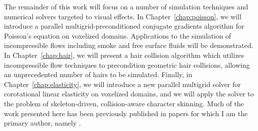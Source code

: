 The remainder of this work will focus on a number of simulation
techniques and numerical solvers targeted to visual effects.  In
Chapter~\ref{chap:poisson}, we will introduce a parallel
multigrid-preconditioned conjugate gradients algorithm for Poisson's
equation on voxelized domains. Applications to the simulation of
incompressible flows including smoke and free surface fluids will be
demonstrated.  In Chapter~\ref{chap:hair}, we will
present a hair collision algorithm which utilizes incompressible flow
techniques to precondition geometric hair collisions, allowing an
unprecedented number of hairs to be simulated.  Finally, in
Chapter~\ref{chap:elasticity}, we will introduce a new parallel multigrid
solver for corotational linear elasticity on voxelized domains, and we
will apply the solver to the problem of skeleton-driven,
collision-aware character skinning.  Much of the work presented here
has been previously published in papers for which I am the primary
author, namely \cite{mcadams:2009:hair,mcadams:2010:mgpcg}.
	
